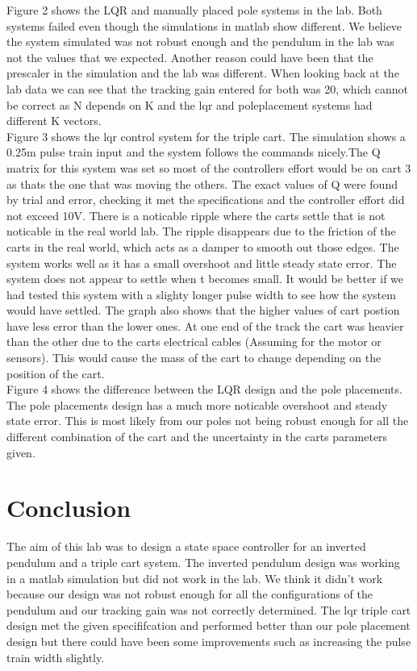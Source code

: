 \documentclass[a4paper,12pt]{article}
\begin{document}
Figure 2 shows the LQR and manually placed pole systems in the lab.  Both systems failed even though the simulations in matlab show different. We believe the system simulated was not robust enough and the pendulum in the lab was not the values that we expected. Another reason could have been that the prescaler in the simulation and the lab was different. When looking back at the lab data we can see that the tracking gain entered for both was 20, which cannot be correct as N depends on K and the lqr and poleplacement systems had different K vectors.\\

Figure 3 shows the lqr control system for the triple cart. The simulation shows a 0.25m pulse train input and the system follows the commands nicely.The Q matrix for this system was set so most of the controllers effort would be on cart 3 as thats the one that was moving the others. The exact values of Q were found by trial and error, checking it met the specifications and the controller effort did not exceed 10V. There is a noticable ripple where the carts settle that is not noticable in the real world lab. The ripple disappears due to the friction of the carts in the real world, which acts as a damper to smooth out those edges. The system works well as it has a small overshoot and little steady state error. The system does not appear to settle when t becomes small. It would be better if we had tested this system with a slighty longer pulse width to see how the system would have settled. The graph also shows that the higher values of cart postion have less error than the lower ones. At one end of the track the cart was heavier than the other due to the carts electrical cables (Assuming for the motor or sensors). This would cause the mass of the cart to change depending on the position of the cart. \\

Figure 4 shows the difference between the LQR design and the pole placements. The pole placements design has a much more noticable overshoot and steady state error. This is most likely from our poles not being robust enough for all the different combination of the cart and the uncertainty in the carts parameters given.


\section{Conclusion}
The aim of this lab was to design a state space controller for an inverted pendulum and a triple cart system. The inverted pendulum design was working in a matlab simulation but did not work in the lab. We think it didn't work because our design was not robust enough for all the configurations of the pendulum and our tracking gain was not correctly determined. The lqr triple cart design met the given specififcation and performed better than our pole placement design but there could have been some improvements such as increasing the pulse train width slightly.
\end{document}
